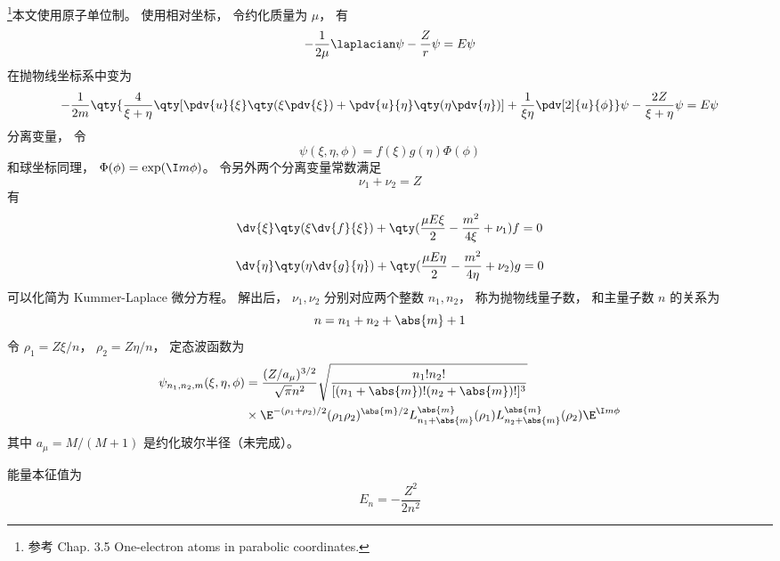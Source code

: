 
\begin{issues}
\issueDraft
{}
\end{issues}


\footnote{参考 \cite{Bransden} Chap. 3.5 One-electron atoms in parabolic coordinates.}本文使用原子单位制。 使用相对坐标， 令约化质量为 $\mu$， 有
\begin{equation}
-\frac{1}{2\mu} \laplacian \psi - \frac{Z}{r} \psi = E\psi
\end{equation}
在抛物线坐标系中变为
\begin{equation}
-\frac{1}{2m} \qty{\frac{4}{\xi + \eta} \qty[\pdv{u}{\xi}\qty(\xi\pdv{\xi}) + \pdv{u}{\eta}\qty(\eta\pdv{\eta})] + \frac{1}{\xi\eta}\pdv[2]{u}{\phi}}\psi - \frac{2Z}{\xi + \eta}\psi = E\psi
\end{equation}
分离变量， 令
\begin{equation}
\psi(\xi, \eta, \phi) = f(\xi) g(\eta) \Phi(\phi)
\end{equation}
和球坐标同理， $\Phi(\phi) = \exp(\I m \phi)$。 令另外两个分离变量常数满足
\begin{equation}
\nu_1 + \nu_2 = Z
\end{equation}
有
\begin{equation}\label{eq_ParaHy_1}
\dv{\xi} \qty(\xi \dv{f}{\xi}) + \qty(\frac{\mu E \xi}{2} - \frac{m^2}{4\xi} + \nu_1) f = 0
\end{equation}
\begin{equation}
\dv{\eta}\qty(\eta \dv{g}{\eta}) + \qty(\frac{\mu E\eta}{2} - \frac{m^2}{4\eta} + \nu_2)g = 0
\end{equation}
可以化简为 Kummer-Laplace 微分方程。 解出后， $\nu_1, \nu_2$ 分别对应两个整数 $n_1, n_2$， 称为抛物线量子数， 和主量子数 $n$ 的关系为
\begin{equation}
n = n_1 + n_2 + \abs{m} + 1
\end{equation}
令 $\rho_1 = Z\xi / n$， $\rho_2 = Z\eta/n$， 定态波函数为
\begin{equation}\label{eq_ParaHy_2}
\begin{aligned}
\psi_{n_1,n_2,m}(\xi,\eta,\phi) &= \frac{(Z/a_\mu)^{3/2}}{\sqrt{\pi} n^2} \sqrt{\frac{n_1!n_2!}{[(n_1+\abs{m})!(n_2+\abs{m})!]^3}} \\
&\times \E^{-(\rho_1+\rho_2)/2}(\rho_1\rho_2)^{\abs{m}/2} L_{n_1 + \abs{m}}^{\abs{m}}(\rho_1) L_{n_2 + \abs{m}}^{\abs{m}}(\rho_2) \E^{\I m\phi}
\end{aligned}
\end{equation}
其中 $a_\mu = M/(M + 1)$ 是约化玻尔半径（未完成）。

能量本征值为
\begin{equation}
E_n = -\frac{Z^2}{2n^2}
\end{equation}
